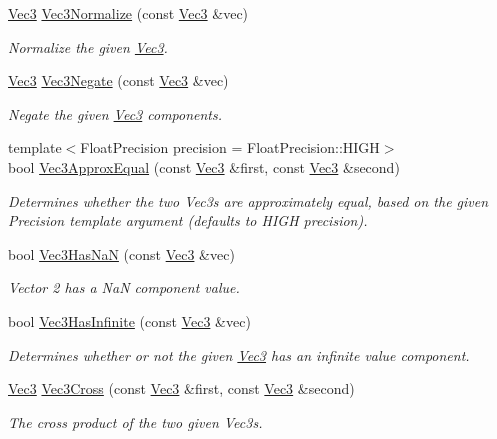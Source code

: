 \begin{DoxyCompactItemize}
\hyperlink{classgfxmath_1_1_vec3}{Vec3} \hyperlink{classgfxmath_1_1_vec3_afdbff8ff3fad75f9a9e924a58fcc4f4a}{Vec3\+Normalize} (const \hyperlink{classgfxmath_1_1_vec3}{Vec3} \&vec)
\begin{DoxyCompactList}\small\item\em Normalize the given \hyperlink{classgfxmath_1_1_vec3}{Vec3}. \end{DoxyCompactList}\item 
\hyperlink{classgfxmath_1_1_vec3}{Vec3} \hyperlink{classgfxmath_1_1_vec3_a8ccc52146f984a79c566ee8348e410e2}{Vec3\+Negate} (const \hyperlink{classgfxmath_1_1_vec3}{Vec3} \&vec)
\begin{DoxyCompactList}\small\item\em Negate the given \hyperlink{classgfxmath_1_1_vec3}{Vec3} components. \end{DoxyCompactList}\item 
{\footnotesize template$<$Float\+Precision precision = Float\+Precision\+::\+H\+I\+G\+H$>$ }\\bool \hyperlink{classgfxmath_1_1_vec3_ac042c4407bfaa66715e3c4b5b0a839f4}{Vec3\+Approx\+Equal} (const \hyperlink{classgfxmath_1_1_vec3}{Vec3} \&first, const \hyperlink{classgfxmath_1_1_vec3}{Vec3} \&second)
\begin{DoxyCompactList}\small\item\em Determines whether the two Vec3s are approximately equal, based on the given Precision template argument (defaults to H\+I\+G\+H precision). \end{DoxyCompactList}\item 
bool \hyperlink{classgfxmath_1_1_vec3_a5d19e3d1ee15741a65ede16f20e919a4}{Vec3\+Has\+Na\+N} (const \hyperlink{classgfxmath_1_1_vec3}{Vec3} \&vec)
\begin{DoxyCompactList}\small\item\em Vector 2 has a Na\+N component value. \end{DoxyCompactList}\item 
bool \hyperlink{classgfxmath_1_1_vec3_ae5205e805b23de865db9a40e5936f82a}{Vec3\+Has\+Infinite} (const \hyperlink{classgfxmath_1_1_vec3}{Vec3} \&vec)
\begin{DoxyCompactList}\small\item\em Determines whether or not the given \hyperlink{classgfxmath_1_1_vec3}{Vec3} has an infinite value component. \end{DoxyCompactList}\item 
\hyperlink{classgfxmath_1_1_vec3}{Vec3} \hyperlink{classgfxmath_1_1_vec3_a455b2ef17c947a780f2b2b9e4b6cccc8}{Vec3\+Cross} (const \hyperlink{classgfxmath_1_1_vec3}{Vec3} \&first, const \hyperlink{classgfxmath_1_1_vec3}{Vec3} \&second)
\begin{DoxyCompactList}\small\item\em The cross product of the two given Vec3s. \end{DoxyCompactList}\end{DoxyCompactItemize}



